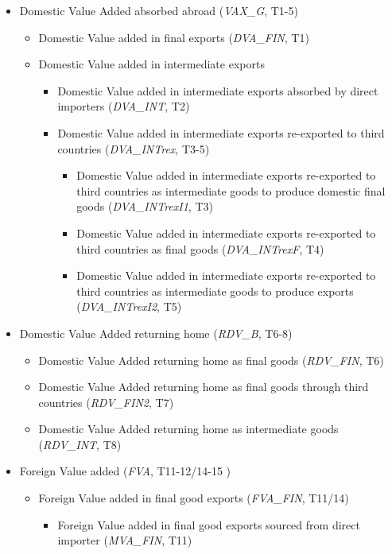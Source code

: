 \documentclass{article}
\begin{document}
\begin{itemize}
\item Domestic Value Added absorbed abroad (\textit{VAX_G}, T1-5)
\begin{itemize}
\item Domestic Value added in final exports (\textit{DVA_FIN}, T1)
\item Domestic Value added in intermediate exports
\begin{itemize}
\item Domestic Value added in intermediate exports absorbed by direct importers (\textit{DVA_INT}, T2)
\item Domestic Value added in intermediate exports re-exported to third countries (\textit{DVA_INTrex}, T3-5)
\begin{itemize}
\item Domestic Value added in intermediate exports re-exported to third countries as intermediate goods to produce domestic final goods (\textit{DVA_INTrexI1}, T3)
\item Domestic Value added in intermediate exports re-exported to third countries as  final goods (\textit{DVA_INTrexF}, T4)
\item Domestic Value added in intermediate exports re-exported to third countries as intermediate goods to produce exports (\textit{DVA_INTrexI2}, T5)
\end{itemize}
\end{itemize}
\end{itemize}
\item Domestic Value Added returning home (\textit{RDV_B}, T6-8)
\begin{itemize}
\item Domestic Value Added returning home as final goods (\textit{RDV_FIN}, T6)
\item Domestic Value Added returning home as final goods through third countries (\textit{RDV_FIN2}, T7)
\item Domestic Value Added returning home as intermediate goods (\textit{RDV_INT}, T8)
\end{itemize}
\item Foreign Value added (\textit{FVA}, T11-12/14-15 )
\begin{itemize}
\item Foreign Value added in final good exports (\textit{FVA_FIN}, T11/14)
\begin{itemize}
\item Foreign Value added in final good exports sourced from direct importer (\textit{MVA_FIN}, T11)

\end{itemize}
\end{itemize}
\end{itemize}
\end{document}
